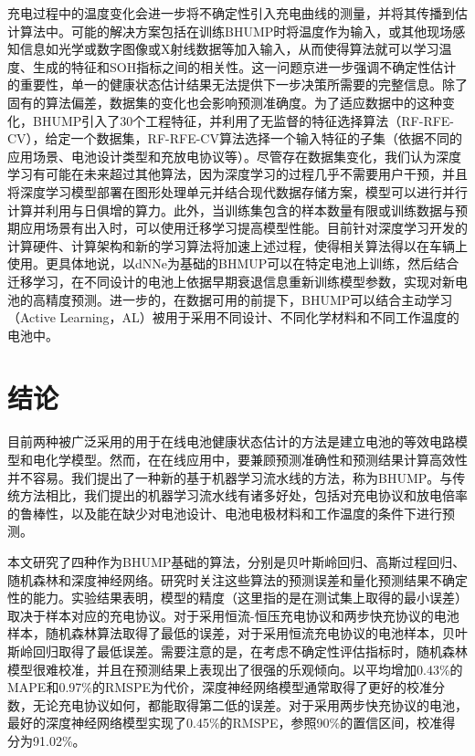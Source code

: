 \documentclass{article}
\begin{document}
充电过程中的温度变化会进一步将不确定性引入充电曲线的测量，并将其传播到估计算法中。可能的解决方案包括在训练BHUMP时将温度作为输入，或其他现场感知信息如光学或数字图像或X射线数据等加入输入，从而使得算法就可以学习温度、生成的特征和SOH指标之间的相关性。这一问题京进一步强调不确定性估计的重要性，单一的健康状态估计结果无法提供下一步决策所需要的完整信息。除了固有的算法偏差，数据集的变化也会影响预测准确度。为了适应数据中的这种变化，BHUMP引入了30个工程特征，并利用了无监督的特征选择算法（RF-RFE-CV），给定一个数据集，RF-RFE-CV算法选择一个输入特征的子集（依据不同的应用场景、电池设计类型和充放电协议等）。尽管存在数据集变化，我们认为深度学习有可能在未来超过其他算法，因为深度学习的过程几乎不需要用户干预，并且将深度学习模型部署在图形处理单元并结合现代数据存储方案，模型可以进行并行计算并利用与日俱增的算力。此外，当训练集包含的样本数量有限或训练数据与预期应用场景有出入时，可以使用迁移学习提高模型性能。目前针对深度学习开发的计算硬件、计算架构和新的学习算法将加速上述过程，使得相关算法得以在车辆上使用。更具体地说，以dNNe为基础的BHMUP可以在特定电池上训练，然后结合迁移学习，在不同设计的电池上依据早期衰退信息重新训练模型参数，实现对新电池的高精度预测。进一步的，在数据可用的前提下，BHUMP可以结合主动学习（Active Learning，AL）被用于采用不同设计、不同化学材料和不同工作温度的电池中。

\section{结论}

目前两种被广泛采用的用于在线电池健康状态估计的方法是建立电池的等效电路模型和电化学模型。然而，在在线应用中，要兼顾预测准确性和预测结果计算高效性并不容易。我们提出了一种新的基于机器学习流水线的方法，称为BHUMP。与传统方法相比，我们提出的机器学习流水线有诸多好处，包括对充电协议和放电倍率的鲁棒性，以及能在缺少对电池设计、电池电极材料和工作温度的条件下进行预测。

本文研究了四种作为BHUMP基础的算法，分别是贝叶斯岭回归、高斯过程回归、随机森林和深度神经网络。研究时关注这些算法的预测误差和量化预测结果不确定性的能力。实验结果表明，模型的精度（这里指的是在测试集上取得的最小误差）取决于样本对应的充电协议。对于采用恒流-恒压充电协议和两步快充协议的电池样本，随机森林算法取得了最低的误差，对于采用恒流充电协议的电池样本，贝叶斯岭回归取得了最低误差。需要注意的是，在考虑不确定性评估指标时，随机森林模型很难校准，并且在预测结果上表现出了很强的乐观倾向。以平均增加0.43\%的MAPE和0.97\%的RMSPE为代价，深度神经网络模型通常取得了更好的校准分数，无论充电协议如何，都能取得第二低的误差。对于采用两步快充协议的电池，最好的深度神经网络模型实现了0.45\%的RMSPE，参照90\%的置信区间，校准得分为91.02\%。
\end{document}
